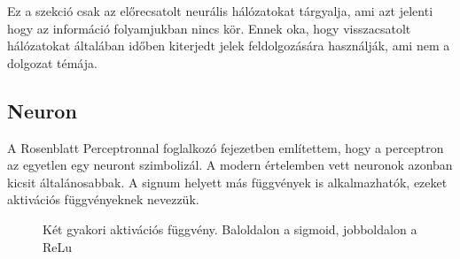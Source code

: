 Ez a szekció csak az előrecsatolt neurális hálózatokat tárgyalja, ami azt jelenti hogy az információ folyamjukban nincs kör. Ennek oka, hogy visszacsatolt hálózatokat általában időben kiterjedt jelek feldolgozására használják, ami nem a dolgozat témája.

\newcommand{\y}{\ensuremath{\boldsymbol y}}
\newcommand{\yvesszo}{\ensuremath{\boldsymbol y'}}
\newcommand{\x}{\ensuremath{\boldsymbol x}}
\newcommand{\w}{\ensuremath{\boldsymbol w}}

\subsection{Neuron}
\label{neuron_section}
A Rosenblatt Perceptronnal foglalkozó fejezetben említettem, hogy a perceptron az egyetlen egy neuront szimbolizál. A modern értelemben vett neuronok azonban kicsit általánosabbak. A signum helyett más függvények is alkalmazhatók, ezeket aktivációs függvényeknek nevezzük.

\begin{figure}[H]
		\begin{subfigure}{\linewidth}
		\end{subfigure}
	\caption{Két gyakori aktivációs függvény. Baloldalon a sigmoid, jobboldalon a ReLu}
\end{figure}


